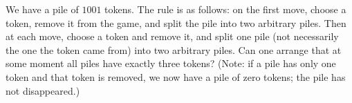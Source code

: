 We have a pile of $1001$ tokens. The rule is as follows: on the first move, choose a token, remove it from the game, and split the pile into two arbitrary piles. Then at each move, choose a token and remove it, and split one pile (not necessarily the one the token came from) into two arbitrary piles. Can one arrange that at some moment all piles have exactly three tokens? (Note: if a pile has only one token and that token is removed, we now have a pile of zero tokens; the pile has not disappeared.)
